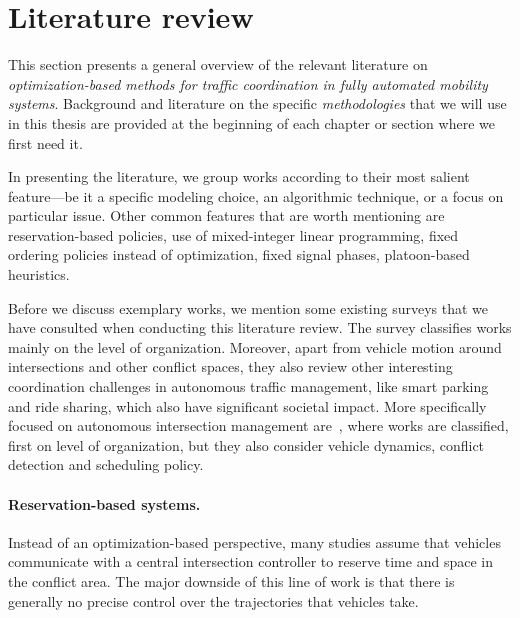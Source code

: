 \documentclass[a4paper]{report}
\theoremstyle{definition}
\theoremstyle{plain}
\newcommand\note[1]{{\color{Navy}#1}}
\begin{document}
\section{Literature review}
This section presents a general overview of the relevant literature on
\emph{optimization-based methods for traffic coordination in fully automated
  mobility systems}. Background and literature on the specific
\emph{methodologies} that we will use in this thesis are provided at the
beginning of each chapter or section where we first need it.

In presenting the literature, we group works according to their most salient
feature---be it a specific modeling choice, an algorithmic technique, or a focus
on particular issue.
%
\note{Other common features that are worth mentioning are reservation-based policies,
use of mixed-integer linear programming, fixed ordering policies instead of
optimization, fixed signal phases, platoon-based heuristics.}

Before we discuss exemplary works, we mention some existing surveys that we have
consulted when conducting this literature review.
%
The survey \cite{marianiCoordinationAutonomousVehicles2022} classifies works
mainly on the level of organization. Moreover, apart from vehicle motion around
intersections and other conflict spaces, they also review other interesting
coordination challenges in autonomous traffic management, like smart parking and
ride sharing, which also have significant societal impact.
%
More specifically focused on autonomous intersection management
are~\cite{khayatianSurveyIntersectionManagement2020}, where works are
classified, first on level of organization, but they also consider vehicle
dynamics, conflict detection and scheduling policy.


\paragraph{Reservation-based systems.}

Instead of an optimization-based perspective, many studies assume that
vehicles communicate with a central intersection controller to reserve time and
space in the conflict area.
%
The major downside of this line of work is that there is generally no precise
control over the trajectories that vehicles take.
\end{document}
